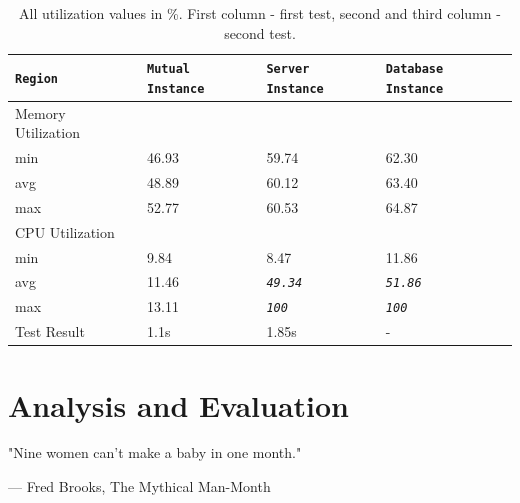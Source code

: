 \documentclass{uvamscse}
\begin{document}
\begin{table}[h]
\begin{center}
\begin{tabular}{llll}
  \texttt{Region}               & \texttt{Mutual Instance} & \texttt{Server Instance} & \texttt{Database Instance} \\
  \hline
  Memory Utilization \\
  min                           & 46.93                    & 59.74                    & 62.30                 \\
  avg                           & 48.89                    & 60.12                    & 63.40                 \\
  max                           & 52.77                    & 60.53                    & 64.87                 \\
  \hline
  CPU Utilization\\
  min                           & 9.84                     & 8.47                     & 11.86                 \\
  avg                           & 11.46                    & \textit{\texttt{49.34}}  & \textit{\texttt{51.86}}                 \\
  max                           & 13.11                    & \textit{\texttt{100}}    & \textit{\texttt{100}}                 \\
  \hline
  Test Result                   & 1.1s                     & 1.85s                    & - \\
\end{tabular}
\end{center}
\caption{All utilization values in \%. First column - first test, second and third column - second test.}
\label{table:redistest}
\end{table}

\chapter{Analysis and Evaluation}\label{Analysis and Evaluation}
\epigraph{"Nine women can't make a baby in one month."}{--- Fred Brooks, The Mythical Man-Month}
\end{document}
